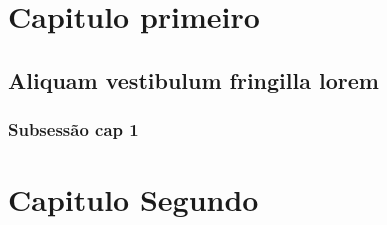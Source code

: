 \chapter{Capitulo primeiro}
\lipsum[2]
\section{Aliquam vestibulum fringilla lorem}

\lipsum[2]
\subsection{Subsessão cap 1}
\lipsum[2]
\chapter{Capitulo Segundo}
\lipsum[2]